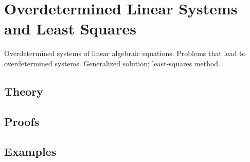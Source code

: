 
\section{Overdetermined Linear Systems and Least Squares}
\label{sec:2.1.07-overdetermined-lsq}

\begin{ticket}
Overdetermined systems of linear algebraic equations. Problems that lead to overdetermined systems. Generalized solution; least-squares method.
\end{ticket}

\subsection*{Theory}

\subsection*{Proofs}

\subsection*{Examples}
